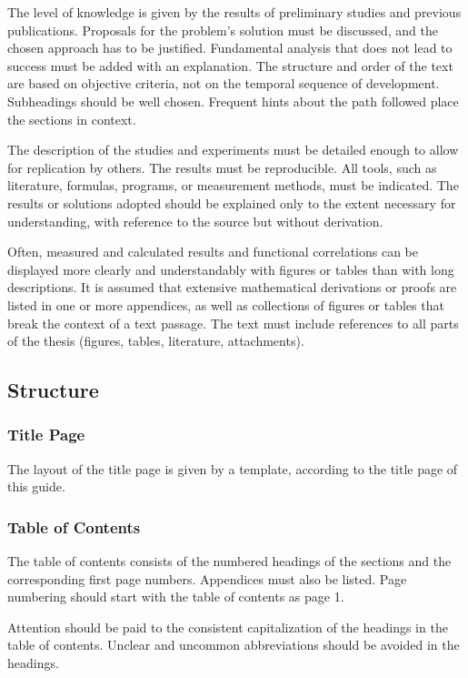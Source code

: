 The level of knowledge is given by the results of preliminary studies and previous publications. Proposals for the problem's solution must be discussed, and the chosen approach has to be justified. Fundamental analysis that does not lead to success must be added with an explanation. The structure and order of the text are based on objective criteria, not on the temporal sequence of development. Subheadings should be well chosen. Frequent hints about the path followed place the sections in context.

The description of the studies and experiments must be detailed enough to allow for replication by others. The results must be reproducible. All tools, such as literature, formulas, programs, or measurement methods, must be indicated. The results or solutions adopted should be explained only to the extent necessary for understanding, with reference to the source but without derivation.

Often, measured and calculated results and functional correlations can be displayed more clearly and understandably with figures or tables than with long descriptions. It is assumed that extensive mathematical derivations or proofs are listed in one or more appendices, as well as collections of figures or tables that break the context of a text passage. The text must include references to all parts of the thesis (figures, tables, literature, attachments).

\subsection{Structure}

\subsubsection{Title Page}

The layout of the title page is given by a template, according to the title page of this guide.

\subsubsection{Table of Contents}

The table of contents consists of the numbered headings of the sections and the corresponding first page numbers. Appendices must also be listed. Page numbering should start with the table of contents as page 1.

Attention should be paid to the consistent capitalization of the headings in the table of contents. Unclear and uncommon abbreviations should be avoided in the headings.

